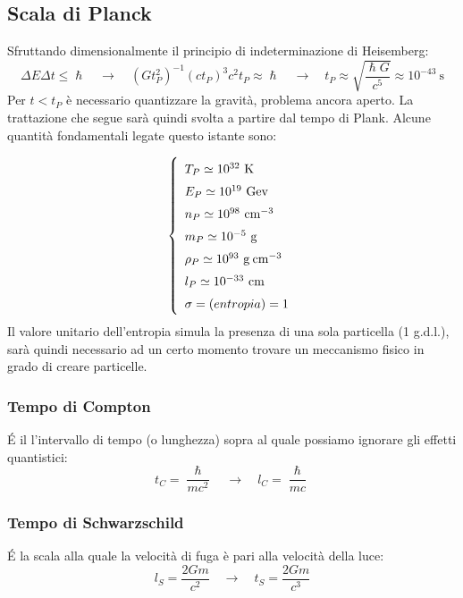 \subsection{Scala di Planck}
Sfruttando dimensionalmente il principio di indeterminazione di Heisemberg:
$$
\Delta E \Delta t \leq \hslash \quad \rightarrow \quad (G t_P^2)^{-1} (c t_P)^{3}c^2 t_P \approx \hslash \quad \rightarrow \quad t_P \approx \sqrt{\frac{\hslash G}{c^5}} \approx 10^{-43}~\mathrm{s}
$$
Per $t<t_P$ è necessario quantizzare la gravità, problema ancora aperto. La trattazione che segue sarà quindi svolta a partire dal tempo di Plank. Alcune quantità fondamentali legate questo istante sono:

\begin{equation*}\left\{
    \def\arraystretch{1.5}
        \begin{array}{ll}
        T_P \simeq 10^{32}~\mathrm{K} \\
        E_P \simeq 10^{19}~\mathrm{Gev} \\
        n_P \simeq 10^{98}~\mathrm{cm}^{-3} \\
        m_P \simeq 10^{-5}~\mathrm{g} \\
        \rho_P \simeq 10^{93}~\mathrm{g\: cm}^{-3}  \\
        l_P \simeq 10^{-33}~\mathrm{cm} \\
        \sigma = (entropia) = 1 
    \end{array}\right.
\end{equation*}
Il valore unitario dell'entropia simula la presenza di una sola particella (1 g.d.l.), sarà quindi necessario ad un certo momento trovare un meccanismo fisico in grado di creare particelle.  

\subsubsection{Tempo di Compton}
É il l'intervallo di tempo (o lunghezza) sopra al quale possiamo ignorare gli effetti quantistici:
\begin{equation}
    t_C = \frac{\hslash}{mc^2} \quad \rightarrow \quad l_C =  \frac{\hslash}{mc}
\end{equation}

\subsubsection{Tempo di Schwarzschild}
É la scala alla quale la velocità di fuga è pari alla velocità della luce:
\begin{equation}
    l_S =  \frac{2Gm}{c^2}  \quad \rightarrow \quad   t_S = \frac{2Gm}{c^3} 
\end{equation}


